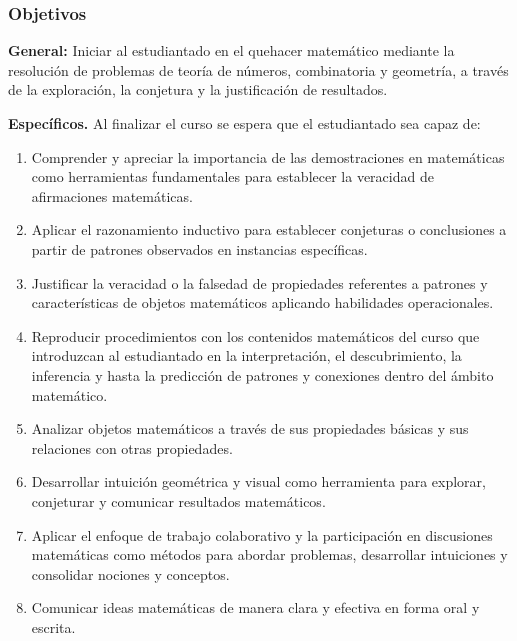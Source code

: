 \begin{refsection}


\subsubsection*{Objetivos}
\textbf{General:} Iniciar al estudiantado en el quehacer matemático mediante la resolución de problemas de teoría de números, combinatoria y geometría, a través de la exploración, la conjetura y
la justificación de resultados.


\textbf{Específicos.} Al finalizar el curso se espera que el estudiantado sea capaz de:

\begin{enumerate}
\item Comprender y apreciar la importancia de las demostraciones en matemáticas como herramientas fundamentales para establecer la veracidad de afirmaciones matemáticas.
\item  Aplicar el razonamiento inductivo para establecer conjeturas o conclusiones a partir de patrones observados en instancias específicas. 
\item  Justificar la veracidad o la falsedad de propiedades referentes a patrones y caracter\'isticas de objetos matem\'aticos aplicando habilidades operacionales.
\item Reproducir procedimientos con los contenidos matemáticos del curso que introduzcan al estudiantado en la interpretación, el descubrimiento, la inferencia y hasta la predicción de patrones y conexiones dentro del ámbito matemático.
 \item Analizar objetos matemáticos a   través de sus propiedades básicas y sus relaciones con otras propiedades. 
 \item Desarrollar intuición geométrica y visual como herramienta para explorar, conjeturar y comunicar resultados matemáticos.
\item Aplicar el enfoque de trabajo colaborativo y la participación en discusiones matemáticas como métodos para abordar problemas, desarrollar intuiciones y consolidar nociones y conceptos.
\item Comunicar ideas matemáticas de manera clara y efectiva en forma oral y escrita.
\end{enumerate}


\end{refsection}
